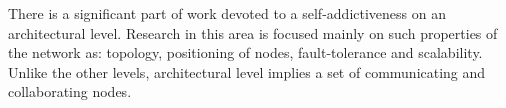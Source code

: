 There is a significant part of work devoted to a self-addictiveness on an
architectural level. Research in this area is focused mainly on such
properties of the network as: topology, positioning of nodes, fault-tolerance
and scalability. Unlike the other levels, architectural level implies a set of
communicating and collaborating nodes.



